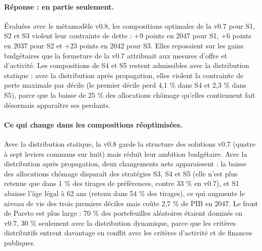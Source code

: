 \paragraph{Réponse : en partie seulement.} Évaluées avec le métamodèle v0.8, les compositions optimales de la v0.7
pour S1, S2 et S3 violent leur contrainte de dette : $+9$ points en 2047 pour S1, $+6$ points en 2037 pour S2 et $+23$
points en 2042 pour S3. Elles reposaient sur les gains budgétaires que la fermeture de la v0.7 attribuait aux mesures
d'offre et d'activité. Les compositions de S4 et S5 restent admissibles avec la distribution statique ; avec la
distribution après propagation, elles violent la contrainte de perte maximale par décile (le premier décile perd
4,1 \% dans S4 et 2,3 \% dans S5), parce que la baisse de 25 \% des allocations chômage qu'elles contiennent fait
désormais apparaître ses perdants.

\paragraph{Ce qui change dans les compositions réoptimisées.} Avec la distribution statique, la v0.8 garde la
structure des solutions v0.7 (quatre à sept leviers communs sur huit) mais réduit leur ambition budgétaire. Avec la
distribution après propagation, deux changements nets apparaissent : la baisse des allocations chômage disparaît des
stratégies S3, S4 et S5 (elle n'est plus retenue que dans 1 \% des tirages de préférences, contre 33 \% en v0.7), et S1
abaisse l'âge légal à 62 ans (retenu dans 54 \% des tirages), ce qui augmente le niveau de vie des trois premiers
déciles mais coûte 2,7 \% de PIB en 2047. Le front de Pareto est plus large : 70 \% des portefeuilles aléatoires
étaient dominés en v0.7, 30 \% seulement avec la distribution dynamique, parce que les critères distributifs entrent
davantage en conflit avec les critères d'activité et de finances publiques.
